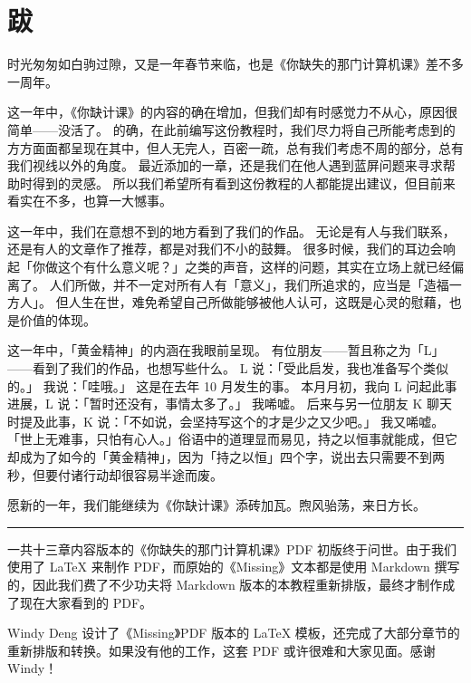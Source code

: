 \chapter*{跋}
\label{afterwords}

时光匆匆如白驹过隙，又是一年春节来临，也是《你缺失的那门计算机课》差不多一周年。

这一年中，《你缺计课》的内容的确在增加，但我们却有时感觉力不从心，原因很简单——没活了。
的确，在此前编写这份教程时，我们尽力将自己所能考虑到的方方面面都呈现在其中，但人无完人，百密一疏，总有我们考虑不周的部分，总有我们视线以外的角度。
最近添加的一章，还是我们在他人遇到蓝屏问题来寻求帮助时得到的灵感。
所以我们希望所有看到这份教程的人都能提出建议，但目前来看实在不多，也算一大憾事。

这一年中，我们在意想不到的地方看到了我们的作品。
无论是有人与我们联系，还是有人的文章作了推荐，都是对我们不小的鼓舞。
很多时候，我们的耳边会响起「你做这个有什么意义呢？」之类的声音，这样的问题，其实在立场上就已经偏离了。
人们所做，并不一定对所有人有「意义」，我们所追求的，应当是「造福一方人」。
但人生在世，难免希望自己所做能够被他人认可，这既是心灵的慰藉，也是价值的体现。

这一年中，「黄金精神」的内涵在我眼前呈现。
有位朋友——暂且称之为「L」——看到了我们的作品，也想写些什么。
L 说：「受此启发，我也准备写个类似的。」
我说：「哇哦。」
这是在去年 10 月发生的事。
本月月初，我向 L 问起此事进展，L 说：「暂时还没有，事情太多了。」
我唏嘘。
后来与另一位朋友 K 聊天时提及此事，K 说：「不如说，会坚持写这个的才是少之又少吧。」
我又唏嘘。
「世上无难事，只怕有心人。」俗语中的道理显而易见，持之以恒事就能成，但它却成为了如今的「黄金精神」，因为「持之以恒」四个字，说出去只需要不到两秒，但要付诸行动却很容易半途而废。

愿新的一年，我们能继续为《你缺计课》添砖加瓦。煦风骀荡，来日方长。


\begin{center}\rule{0.5\linewidth}{0.5pt}\end{center}

一共十三章内容版本的《你缺失的那门计算机课》PDF 初版终于问世。由于我们使用了 \LaTeX{} 来制作 PDF，而原始的《Missing》文本都是使用 Markdown 撰写的，因此我们费了不少功夫将 Markdown 版本的本教程重新排版，最终才制作成了现在大家看到的 PDF。

Windy Deng 设计了《Missing》PDF 版本的 \LaTeX{} 模板，还完成了大部分章节的重新排版和转换。如果没有他的工作，这套 PDF 或许很难和大家见面。感谢 Windy！

